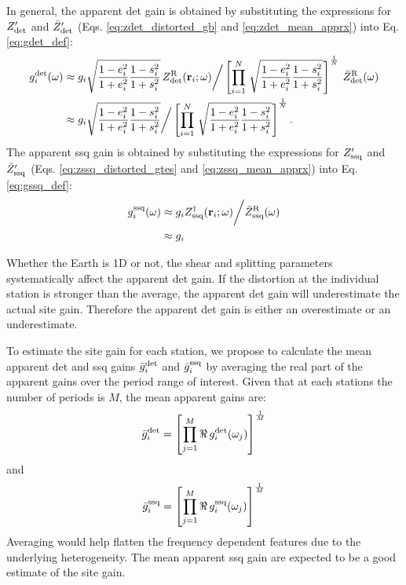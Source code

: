 In general, the apparent det gain is obtained by substituting the expressions for $Z_\text{det}'$ and $\bar{Z}'_{\mathrm{det}}$  (Eqs. \ref{eq:zdet_distorted_gb} and \ref{eq:zdet_mean_apprx}) into Eq. \eqref{eq:gdet_def}:
\begin{equation}
\begin{split}
	g^{\mathrm{det}}_i(\omega) 
	& \approx g_i \sqrt{\frac{1-e_i^2}{1+e_i^2}\frac{1-s_i^2}{1+s_i^2}}\,  Z_\text{det}^{\text{R}} (\mathbf{r}_i;\omega) \bigg/ \left[ \prod\limits_{i=1}^{N}\, \sqrt{\frac{1-e_i^2}{1+e_i^2} \frac{1-s_i^2}{1+s_i^2}} \right]^\frac{1}{N}\, \bar{Z}_{\mathrm{det}}^{\text{R}}(\omega)\\
	 & \approx g_i \sqrt{\frac{1-e_i^2}{1+e_i^2}\frac{1-s_i^2}{1+s_i^2}} \bigg/ \left[ \prod\limits_{i=1}^{N}\, \sqrt{\frac{1-e_i^2}{1+e_i^2} \frac{1-s_i^2}{1+s_i^2}} \right]^\frac{1}{N}.
\end{split}
\end{equation}
The apparent ssq gain is obtained by substituting the expressions for $Z_\text{ssq}'$ and $\bar{Z}'_{\mathrm{ssq}}$  (Eqs. \ref{eq:zssq_distorted_gtes} and \ref{eq:zssq_mean_apprx}) into Eq. \eqref{eq:gssq_def}:
\begin{equation}
\begin{split}
	g^{\mathrm{ssq}}_i(\omega) & \approx g_i Z_\text{ssq}^\dagger(\mathbf{r}_i;\omega) \bigg/  \bar{Z}_{\mathrm{ssq}}^{\text{R}}(\omega) \\
		& \approx g_i \\
\end{split}
\end{equation}

Whether the Earth is 1D or not, the shear and splitting parameters systematically affect the apparent det gain. If the distortion at the individual station is stronger than the average, the apparent det gain will underestimate the actual site gain. 
%
Therefore the apparent det gain is either an overestimate or an underestimate.


To estimate the site gain for each station, we propose to calculate the mean apparent det and ssq gains $\bar{g}^{\mathrm{det}}_i$ and $\bar{g}^{\mathrm{ssq}}_i$ by averaging the real part of the apparent gains over the period range of interest.
Given that at each stations the number of periods is $M$, the mean apparent gains are:
\begin{equation}\label{eq:gdet_mean_def}
	\gdetimean = \left[\prod\limits_{j=1}^{M} \Re\,\gdeti(\omega_j) \right]^\frac{1}{M}
\end{equation}
and
\begin{equation}\label{eq:gssq_mean_def}
	\gssqimean = \left[\prod\limits_{j=1}^{M} \Re\,\gssqi(\omega_j) \right]^\frac{1}{M}
\end{equation}
Averaging would help flatten the frequency dependent features due to the underlying heterogeneity.
The mean apparent ssq gain are expected to be a good estimate of the site gain.



